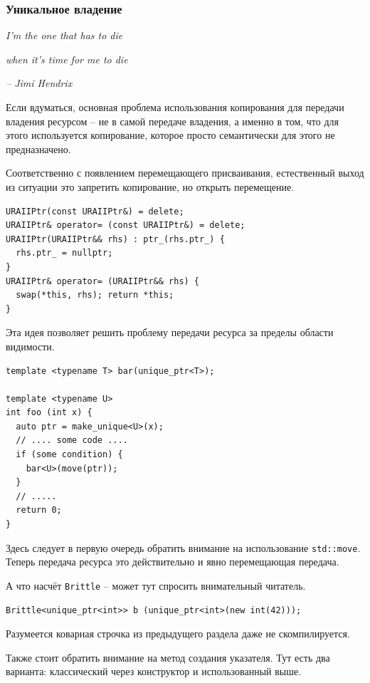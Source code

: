 \documentclass[a4paper,12pt,oneside]{article}
\begin{document}
\subsubsection{Уникальное владение}\label{subsub:uniqueptrs}

\hfill\textit{I'm the one that has to die}

\hfill\textit{when it's time for me to die}{\vspace{0.5em}}

\hfill\textit{-- Jimi Hendrix}

Если вдуматься, основная проблема использования копирования для передачи владения ресурсом -- не в самой передаче владения, а именно в том, что для этого используется копирование, которое просто семантически для этого не предназначено.

Соответственно с появлением перемещающего присваивания, естественный выход из ситуации это запретить копирование, но открыть перемещение.

\begin{lstlisting}
URAIIPtr(const URAIIPtr&) = delete;
URAIIPtr& operator= (const URAIIPtr&) = delete;
URAIIPtr(URAIIPtr&& rhs) : ptr_(rhs.ptr_) { 
  rhs.ptr_ = nullptr; 
} 
URAIIPtr& operator= (URAIIPtr&& rhs) { 
  swap(*this, rhs); return *this; 
}
\end{lstlisting}

Эта идея позволяет решить проблему передачи ресурса за пределы области видимости.

\begin{lstlisting}
template <typename T> bar(unique_ptr<T>);

template <typename U>
int foo (int x) {
  auto ptr = make_unique<U>(x);
  // .... some code ....
  if (some condition) {
    bar<U>(move(ptr));
  }
  // .....
  return 0;
}
\end{lstlisting}

Здесь следует в первую очередь обратить внимание на использование \lstinline!std::move!. Теперь передача ресурса это действительно и явно перемещающая передача.

А что насчёт \lstinline!Brittle! -- может тут спросить внимательный читатель.

\begin{lstlisting}
Brittle<unique_ptr<int>> b (unique_ptr<int>(new int(42)));
\end{lstlisting}

Разумеется коварная строчка из предыдущего раздела даже не скомпилируется.

Также стоит обратить внимание на метод создания указателя. Тут есть два варианта: классический через конструктор и использованный выше.
\end{document}
